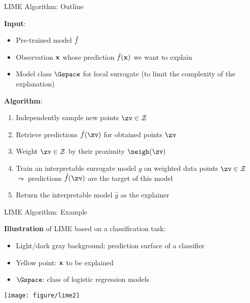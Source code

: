 \documentclass[10pt,compress,t,notes=noshow, xcolor=table]{beamer}
\newcommand{\gh}{\hat{g}}
\begin{document}
\begin{frame}[c]{LIME Algorithm: Outline}
		
		\textbf{Input}:
		\begin{itemize}
		    \item Pre-trained model $\hat{f}$
		    \item Observation $\mathbf{x}$ whose prediction $\hat{f}(\mathbf{x})$ we want to explain
		    \item Model class $\Gspace$ for local surrogate (to limit the complexity of the explanation)
		\end{itemize}
		
		\pause
		\medskip
		
		\textbf{Algorithm}:
		\begin{enumerate}
    		\item Independently sample new points $\zv \in \Zspace$ 
    		\item Retrieve predictions $\fh(\zv)$ for obtained points $\zv$ 
    		\item Weight $\zv \in \Zspace$ by their proximity $\neigh(\zv)$
    		\item Train an interpretable surrogate model $g$ on weighted data points $\zv \in \Zspace$\\ $\leadsto$ predictions $\fh(\zv)$ are the target of this model
    		\item Return the interpretable model $\gh$ as the explainer
		\end{enumerate}
		

	
\end{frame} 

\begin{frame}[c]{LIME Algorithm: Example}

    	\textbf{Illustration} of LIME based on a classification task:
		\begin{itemize}
			\item Light/dark gray background: prediction surface of a classifier
			\item Yellow point: $\mathbf{x}$ to be explained
			\item $\Gspace$: class of logistic regression models 
		\end{itemize}
		\begin{center}
			\texttt{[image: figure/lime2]}
		\end{center}

\end{frame} 
\end{document}
